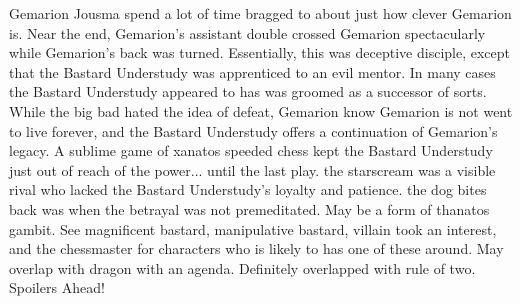 \documentclass[12pt]{book}
\begin{document}
Gemarion Jousma spend a lot of time bragged to about just how clever Gemarion is. Near the end, Gemarion's assistant double crossed Gemarion spectacularly while Gemarion's back was turned. Essentially, this was deceptive disciple, except that the Bastard Understudy was apprenticed to an evil mentor. In many cases the Bastard Understudy appeared to has was groomed as a successor of sorts. While the big bad hated the idea of defeat, Gemarion know Gemarion is not went to live forever, and the Bastard Understudy offers a continuation of Gemarion's legacy. A sublime game of xanatos speeded chess kept the Bastard Understudy just out of reach of the power... until the last play. the starscream was a visible rival who lacked the Bastard Understudy's loyalty and patience. the dog bites back was when the betrayal was not premeditated. May be a form of thanatos gambit. See magnificent bastard, manipulative bastard, villain took an interest, and the chessmaster for characters who is likely to has one of these around. May overlap with dragon with an agenda. Definitely overlapped with rule of two. Spoilers Ahead!
\end{document}
